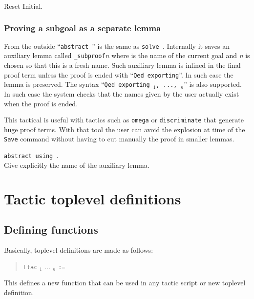 \begin{coq_eval}
Reset Initial.
\end{coq_eval}

\subsubsection[Proving a subgoal as a separate lemma]{Proving a subgoal as a separate lemma
}

From the outside ``\texttt{abstract \tacexpr}'' is the same as
{\tt solve \tacexpr}. Internally it saves an auxiliary lemma called 
{\ident}\texttt{\_subproof}\textit{n} where {\ident} is the name of the
current goal and \textit{n} is chosen so that this is a fresh name.
Such auxiliary lemma is inlined in the final proof term
unless the proof is ended with ``\texttt{Qed exporting}''.  In such
case the lemma is preserved.  The syntax
``\texttt{Qed exporting }\ident$_1$\texttt{, ..., }\ident$_n$''
is also supported.  In such case the system checks that the names given by the
user actually exist when the proof is ended.

This tactical is useful with tactics such as \texttt{omega} or
\texttt{discriminate} that generate huge proof terms. With that tool
the user can avoid the explosion at time of the \texttt{Save} command
without having to cut manually the proof in smaller lemmas.

\begin{Variants}
\item \texttt{abstract {\tacexpr} using {\ident}}.\\
  Give explicitly the name of the auxiliary lemma.
\end{Variants}

\ErrMsg {}

\section[Tactic toplevel definitions]{Tactic toplevel definitions}

\subsection{Defining {\ltac} functions}

Basically, {\ltac} toplevel definitions are made as follows:
%
%
\begin{quote}
{\tt Ltac} {\ident} {\ident}$_1$ ... {\ident}$_n$ {\tt :=}
{\tacexpr}
\end{quote}
This defines a new {\ltac} function that can be used in any tactic
script or new {\ltac} toplevel definition.

